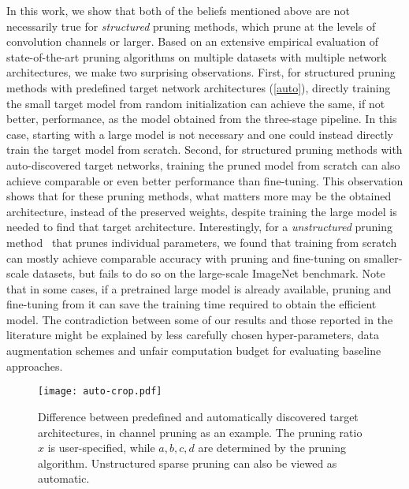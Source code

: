 In this work, we show that both of the beliefs mentioned above are not necessarily true for \emph{structured} pruning methods, which prune at the levels of convolution channels or larger. Based on an extensive empirical evaluation of state-of-the-art pruning algorithms on multiple datasets with multiple network architectures, we make two surprising observations. First, for structured pruning methods with predefined target network architectures (\autoref{auto}), directly training the small target model from random initialization can achieve the same, if not better, performance, as the model obtained from the three-stage pipeline.
In this case, starting with a large model is not necessary and one could instead directly train the target model from scratch.
Second, for structured pruning methods with auto-discovered target networks, training the pruned model from scratch can also achieve comparable or even better performance than fine-tuning. This observation shows that for these pruning methods, what matters more may be the obtained architecture, instead of the preserved weights, despite training the large model is needed to find that target architecture. 
Interestingly, for a \emph{unstructured} pruning method~\cite{han2015learning} that prunes individual parameters, we found that training from scratch can mostly achieve comparable accuracy with pruning and fine-tuning on smaller-scale datasets, but fails to do so on the large-scale ImageNet benchmark.
Note that in some cases, if a pretrained large model is already available, pruning and fine-tuning from it can save the training time required to obtain the efficient model.
The contradiction between some of our results and those reported in the literature might be explained by less carefully chosen hyper-parameters, data augmentation schemes and unfair computation budget for evaluating baseline approaches.

\begin{figure}
  \begin{center}
    \texttt{[image: auto-crop.pdf]}
  \end{center}
\caption{Difference between predefined and automatically discovered target architectures, in channel pruning as an example. The pruning ratio $x$ is user-specified, while $a, b, c, d$ are determined by the pruning algorithm. Unstructured sparse pruning can also be viewed as automatic.} 
    \label{auto}
\end{figure}



